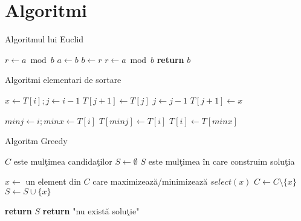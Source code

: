 \documentclass{article}
\begin{document}
\section*{Algoritmi}

\begin{algorithm}
\caption{Algoritmul lui Euclid}\label{euclid}
\begin{algorithmic}[1]
\State $r\gets a\bmod b$
\State $a\gets b$
\State $b\gets r$
\State $r\gets a\bmod b$
\EndWhile\label{euclidendwhile}
\State \textbf{return} $b$
\EndProcedure
\end{algorithmic}
\end{algorithm}

\begin{algorithm}
\caption{Algoritmi elementari de sortare}\label{sortare}
\begin{algorithmic}[1]
		\State $x \gets T[i]; j \gets i-1$
			\State $T[j+1] \gets T[j]$
			\State $j \gets j-1$
		\EndWhile
		\State $T[j+1] \gets x$
	\EndFor
\EndProcedure

		\State $minj \gets i; minx \gets T[i]$
			\EndIf
		\EndFor
		\State $T[minj] \gets T[i]$
		\State $T[i] \gets T[minx]$
	\EndFor
\EndProcedure
\end{algorithmic}
\end{algorithm}

\begin{algorithm}
\caption{Algoritm Greedy}\label{greedy}
\begin{algorithmic}[1]
	\Comment $C$ este mulţimea candidaţilor
	\State $S \gets \emptyset$ \Comment $S$ este mulţimea în care construim soluţia

		\State $x \gets$ un element din $C$ care maximizează/minimizează $select(x)$
		\State $C \gets C \setminus \{x\}$
			\State $S \gets S \cup \{x\}$
		\EndIf
	\EndWhile

		\State \textbf{return} $S$	
	\Else
		\State \textbf{return} "nu există soluţie"
	\EndIf
\EndProcedure
\end{algorithmic}
\end{algorithm}
\end{document}
